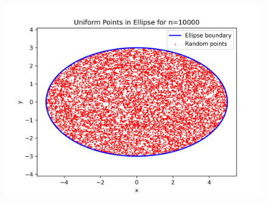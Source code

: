 \documentclass[a4paper,12pt]{article}
\begin{document}
\begin{figure}[h!]
\begin{minipage}{0.33\textwidth}
        \includegraphics[width=\textwidth]{./Screenshots/Exercise5.3.png}
    \end{minipage}
\end{figure}
\newpage
\end{document}
